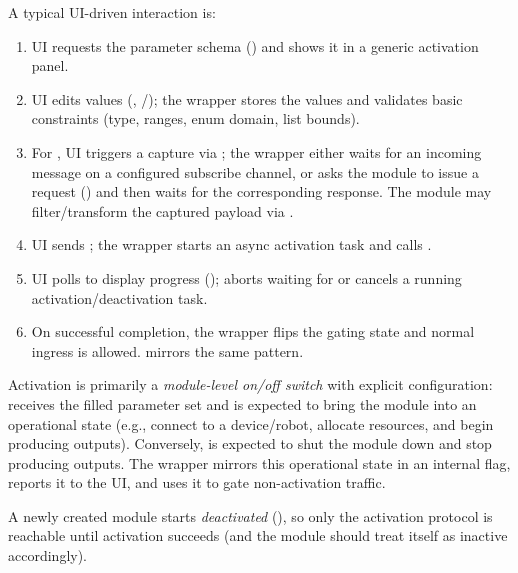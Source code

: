 A typical UI-driven interaction is:
\begin{enumerate}
    \item UI requests the parameter schema () and shows it in a generic activation panel.
    \item UI edits values (, /); the wrapper stores the values and validates basic constraints (type, ranges, enum domain, list bounds).
    \item For , UI triggers a capture via ; the wrapper either waits for an incoming message on a configured subscribe channel, or asks the module to issue a request () and then waits for the corresponding response. The module may filter/transform the captured payload via .
    \item UI sends ; the wrapper starts an async activation task and calls .
    \item UI polls  to display progress ();  aborts waiting for  or cancels a running activation/deactivation task.
    \item On successful completion, the wrapper flips the gating state and normal ingress is allowed.  mirrors the same pattern.
\end{enumerate}


Activation is primarily a \emph{module-level on/off switch} with explicit configuration:  receives the filled parameter set and is expected to bring the module into an operational state (e.g., connect to a device/robot, allocate resources, and begin producing outputs). Conversely,  is expected to shut the module down and stop producing outputs. The wrapper mirrors this operational state in an internal  flag, reports it to the UI, and uses it to gate non-activation traffic.

A newly created module starts \emph{deactivated} (), so only the activation protocol is reachable until activation succeeds (and the module should treat itself as inactive accordingly).

